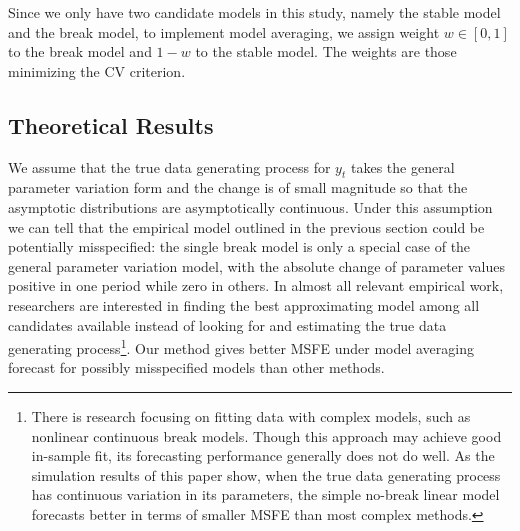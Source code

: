 Since we only have two candidate models in this study, namely the stable model and the break model, to implement model averaging, we assign weight $w \in [0,1]$ to the break model and $1 - w$ to the stable model. The weights are those minimizing the CV criterion.
\subsection{Theoretical Results}
We assume that the true data generating process for $y_t$ takes the general parameter variation form and the change is of small magnitude so that the asymptotic distributions are asymptotically continuous. Under this assumption we can tell that the empirical model outlined in the previous section could be potentially misspecified: the single break model is only a special case of the general parameter variation model, with the absolute change of parameter values positive in one period while zero in others. In almost all relevant empirical work, researchers are interested in finding the best approximating model among all candidates available instead of looking for and estimating the true data generating process\footnote{There is research focusing on fitting data with complex models, such as nonlinear continuous break models. Though this approach may achieve good in-sample fit, its forecasting performance generally does not do well. As the simulation results of this paper show, when the true data generating process has continuous variation in its parameters, the simple no-break linear model forecasts better in terms of smaller MSFE than most complex methods.}. Our method gives better MSFE under model averaging forecast for possibly misspecified models than other methods.
